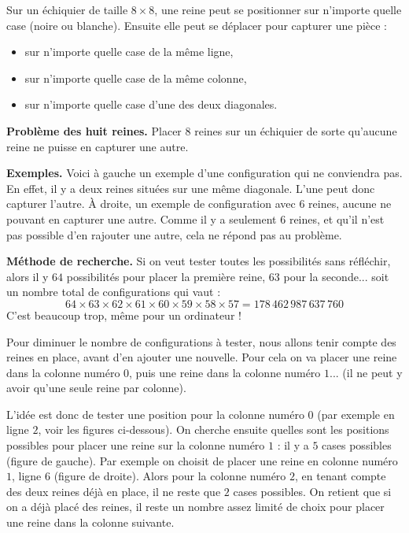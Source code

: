 \documentclass[11pt,class=report,crop=false]{standalone}
\begin{document}
\begin{cours}


Sur un échiquier de taille $8\times 8$, une reine peut se positionner sur n'importe quelle case (noire ou blanche). Ensuite elle peut se déplacer pour capturer une pièce :
\begin{itemize}
  \item sur n'importe quelle case de la même ligne,
  \item sur n'importe quelle case de la même colonne,
  \item sur n'importe quelle case d'une des deux diagonales.
\end{itemize}


\bigskip

\textbf{Problème des huit reines.} Placer $8$ reines sur un échiquier de sorte qu'aucune reine ne puisse en capturer une autre.

\bigskip

\textbf{Exemples.} Voici à gauche un exemple d'une configuration qui ne conviendra pas. En effet, il y a deux reines situées sur une même diagonale. L'une peut donc capturer l'autre.
À droite, un exemple de configuration avec $6$ reines, aucune ne pouvant en capturer une autre. Comme il y a seulement $6$ reines, et qu'il n'est pas possible d'en rajouter une autre, cela ne répond pas au problème.


\bigskip

\textbf{Méthode de recherche.}
Si on veut tester toutes les possibilités sans réfléchir, alors il y $64$ possibilités pour placer la première reine, $63$ pour la seconde... soit un nombre total de configurations qui vaut :
$$64\times 63\times 62 \times 61 \times 60 \times 59 \times 58 \times 57 = 178\,462\,987\,637\,760$$
C'est beaucoup trop, même pour un ordinateur !

Pour diminuer le nombre de configurations à tester, nous allons tenir compte des reines en place, avant d'en ajouter une nouvelle. Pour cela on va placer une reine dans la colonne numéro $0$, puis une reine dans la colonne numéro $1$... (il ne peut y avoir qu'une seule reine par colonne).

L'idée est donc de tester une position pour la colonne numéro $0$ (par exemple en ligne $2$, voir les figures ci-dessous). On cherche ensuite quelles sont les positions possibles pour placer une reine sur la colonne numéro $1$ : il y a $5$ cases possibles (figure de gauche). 
Par exemple on choisit de placer une reine en colonne numéro $1$, ligne $6$ (figure de droite). Alors pour la colonne numéro $2$, en tenant compte des deux reines déjà en place, il ne reste que $2$ cases possibles. On retient que si on a déjà placé des reines, il reste un nombre assez limité de choix pour placer une reine dans la colonne suivante.


\end{cours}
\end{document}
